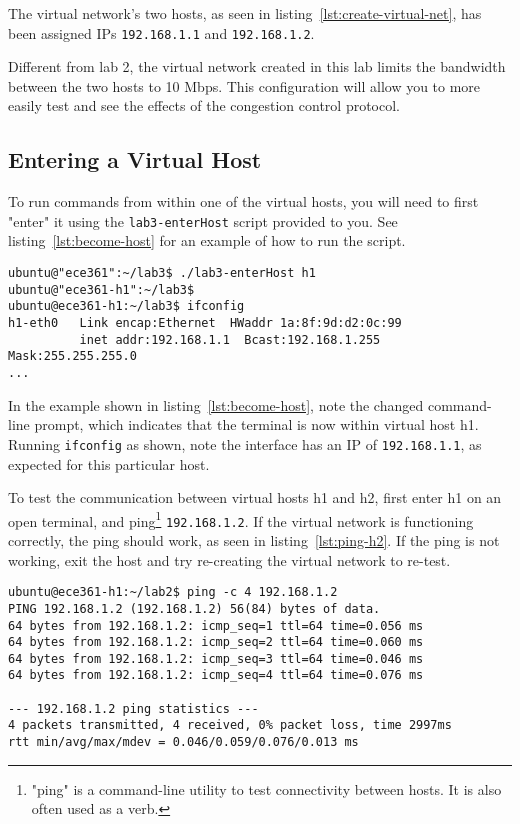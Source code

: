 \documentclass[11pt]{article}
\begin{document}
The virtual network's two hosts, as seen in listing~\ref{lst:create-virtual-net}, has been assigned IPs \texttt{192.168.1.1} and \texttt{192.168.1.2}.

Different from lab 2, the virtual network created in this lab limits the bandwidth between the two hosts to 10 Mbps. This configuration will allow you to more easily test and see the effects of the congestion control protocol.


\subsection{Entering a Virtual Host}
To run commands from within one of the virtual hosts, you will need to first "enter" it using the \texttt{lab3-enterHost} script provided to you.
See listing~\ref{lst:become-host} for an example of how to run the script.

\begin{lstlisting}[style=ece361shell, caption={Entering into one of the virtual hosts.}, label={lst:become-host}]
ubuntu@"ece361":~/lab3$ ./lab3-enterHost h1
ubuntu@"ece361-h1":~/lab3$
ubuntu@ece361-h1:~/lab3$ ifconfig
h1-eth0   Link encap:Ethernet  HWaddr 1a:8f:9d:d2:0c:99
          inet addr:192.168.1.1  Bcast:192.168.1.255  Mask:255.255.255.0
...
\end{lstlisting}

In the example shown in listing~\ref{lst:become-host}, note the changed command-line prompt, which indicates that the terminal is now within virtual host h1.
Running \texttt{ifconfig} as shown, note the interface has an IP of \texttt{192.168.1.1}, as expected for this particular host.

To test the communication between virtual hosts h1 and h2, first enter h1 on an open terminal, and ping\footnote{"ping" is a command-line utility to test connectivity between hosts. It is also often used as a verb.} \texttt{192.168.1.2}.
If the virtual network is functioning correctly, the ping should work, as seen in listing~\ref{lst:ping-h2}. If the ping is not working, exit the host and try re-creating the virtual network to re-test.

\begin{lstlisting}[style=ece361shell, caption={Pinging h2 from within h1.}, label={lst:ping-h2}]
ubuntu@ece361-h1:~/lab2$ ping -c 4 192.168.1.2
PING 192.168.1.2 (192.168.1.2) 56(84) bytes of data.
64 bytes from 192.168.1.2: icmp_seq=1 ttl=64 time=0.056 ms
64 bytes from 192.168.1.2: icmp_seq=2 ttl=64 time=0.060 ms
64 bytes from 192.168.1.2: icmp_seq=3 ttl=64 time=0.046 ms
64 bytes from 192.168.1.2: icmp_seq=4 ttl=64 time=0.076 ms

--- 192.168.1.2 ping statistics ---
4 packets transmitted, 4 received, 0% packet loss, time 2997ms
rtt min/avg/max/mdev = 0.046/0.059/0.076/0.013 ms
\end{lstlisting}
\end{document}
